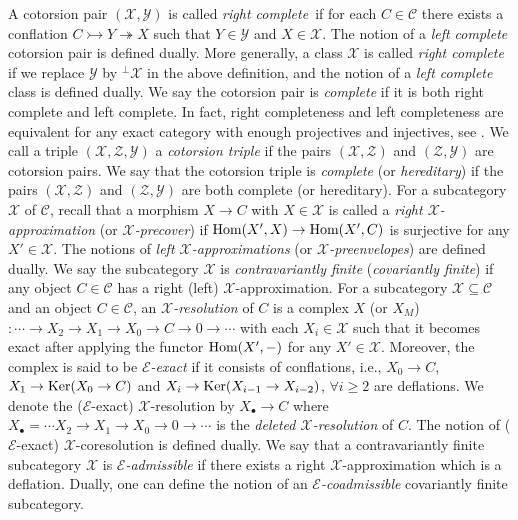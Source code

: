 \documentclass[reqno,12pt]{amsart}
\numberwithin{equation}{section}
\def\Ker{\mbox{\rm Ker}} \def\im{\mbox{\rm Im}} \def\Coker{\mbox{\rm Coker}}\def\mod{\mbox{\rm mod}}
\theoremstyle{plain}
\theoremstyle{definition}
\begin{document}
A cotorsion pair $(\mathcal{X},\mathcal{Y})$ is called {\it right complete}\,\cite{L20} if for
each $C\in\mathcal{C}$ there exists a conflation $C\rightarrowtail Y\twoheadrightarrow X$ such
that $Y\in\mathcal{Y}$ and $X\in\mathcal{X}$. The notion of a {\it left complete} cotorsion
pair is defined dually. More generally, a class $\mathcal{X}$ is called {\it right complete}
if we replace $\mathcal{Y}$ by $^{\perp}\mathcal{X}$ in the above definition, and the notion
of a {\it left complete} class is defined dually. We say the cotorsion pair is {\it complete}
if it is both right complete and left complete. In fact, right completeness and left completeness are equivalent for any exact category with enough projectives and injectives,
see \cite[2.1]{SWZ25}. We call a triple $(\mathcal{X},\mathcal{Z},\mathcal{Y})$ a
{\it cotorsion triple} if the pairs $(\mathcal{X},\mathcal{Z})$ and
$(\mathcal{Z},\mathcal{Y})$ are cotorsion pairs. We say that the cotorsion triple is
{\it complete} (or {\it hereditary}) if the pairs $(\mathcal{X},\mathcal{Z})$ and
$(\mathcal{Z},\mathcal{Y})$ are both complete (or hereditary). For a subcategory $\mathcal{X}$
of $\mathcal{C}$, recall that a morphism $X\to C$ with $X\in\mathcal{X}$ is called a {\it right $\mathcal{X}$-approximation} (or {\it $\mathcal{X}$-precover}) if
$\mbox{\rm Hom}(X',X)\to\mbox{\rm Hom}(X',C)$ is surjective for any $X'\in\mathcal{X}$.
The notions of {\it left $\mathcal{X}$-approximations}
(or {\it $\mathcal{X}$-preenvelopes}) are defined dually. We say the subcategory
$\mathcal{X}$ is {\it contravariantly finite} ({\it covariantly finite}) if any object
$C\in\mathcal{C}$ has a right (left) $\mathcal{X}$-approximation. For a
subcategory $\mathcal{X}\subseteq\mathcal{C}$ and an object $C\in\mathcal{C}$,
an {\it $\mathcal{X}$-resolution} of $C$ is a complex $X$ (or $X_M$)
$:\cdots\to X_2\to X_1\to X_0\to C\to 0\to \cdots$ with each $X_i\in\mathcal{X}$ such that
it becomes exact after applying the functor $\mbox{\rm Hom}(X',-)$ for any $X'\in\mathcal{X}$. Moreover,
the complex is said to be {\it $\mathcal{E}$-exact} if it consists of conflations, i.e.,
$X_0\to C$, $X_1\to \Ker(X_0\to C)$ and $X_i\to \Ker(X_{i-1}\to X_{i-2})$, $\forall i\geq 2$
are deflations. We denote the ($\mathcal{E}$-exact) $\mathcal{X}$-resolution by
$X_{\bullet}\to C$ where $X_{\bullet}=\cdots X_2\to X_1\to X_0\to 0\to \cdots$ is the
{\it deleted $\mathcal{X}$-resolution} of $C$. The notion of ($\mathcal{E}$-exact)
$\mathcal{X}$-coresolution is defined dually. We say that a contravariantly finite subcategory
$\mathcal{X}$ is {\it $\mathcal{E}$-admissible} if there exists a right
$\mathcal{X}$-approximation which is a deflation. Dually, one can define the notion of an
{\it $\mathcal{E}$-coadmissible} covariantly finite subcategory.
\end{document}
